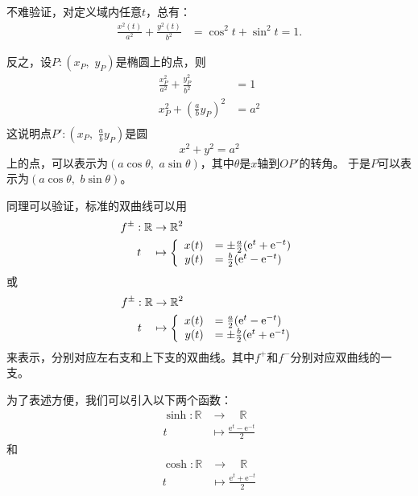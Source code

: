 \documentclass[12pt,UTF8]{ctexbook}
\begin{document}
不难验证，对定义域内任意$t$，总有：
\begin{align*}
    \frac{x^2(t)}{a^2} + \frac{y^2(t)}{b^2} &= \cos^2{t} + \sin^2{t} = 1.
\end{align*}

反之，设$P:(x_P,\,\,y_P)$是椭圆上的点，则
\begin{align*}
    \frac{x_P^2}{a^2} + \frac{y_P^2}{b^2} &= 1\\
   x_P^2 + \left(\frac{a}{b}y_P\right)^2 & = a^2 \\
\end{align*}
这说明点$\displaystyle P': \left(x_P,\,\,\frac{a}{b}y_P\right)$是圆
$$ x^2 + y^2 = a^2$$
上的点，可以表示为$(a\cos{\theta},\,\,a\sin{\theta})$，其中$\theta$是$x$轴到$OP'$的转角。
于是$P$可以表示为$(a\cos{\theta},\,\,b\sin{\theta})$。

同理可以验证，标准的双曲线可以用
\begin{align*}
    f^{\pm}: \mathbb{R} &\rightarrow \mathbb{R}^2 \\
    t\quad &\mapsto\left\{
        \begin{array}[]{rl}
            x(t) &= \pm\frac{a}{2}(\mathrm{e}^t + \mathrm{e}^{-t}) \\
            y(t) &= \frac{b}{2}(\mathrm{e}^t - \mathrm{e}^{-t}) \\
        \end{array}
    \right.
\end{align*}
或
\begin{align*}
    f^{\pm}: \mathbb{R} &\rightarrow \mathbb{R}^2 \\
    t\quad &\mapsto\left\{
        \begin{array}[]{rl}
            x(t) &= \frac{a}{2}(\mathrm{e}^t - \mathrm{e}^{-t}) \\
            y(t) &= \pm\frac{b}{2}(\mathrm{e}^t + \mathrm{e}^{-t}) \\
        \end{array}
    \right.
\end{align*}
来表示，分别对应左右支和上下支的双曲线。其中$f^+$和$f^-$分别对应双曲线的一支。

为了表述方便，我们可以引入以下两个函数：
\begin{align*}
    \sinh: \mathbb{R} &\rightarrow \quad \mathbb{R} \\
    t\; &\mapsto \frac{\mathrm{e}^t - \mathrm{e}^{-t}}{2} 
\end{align*}
和
\begin{align*}
    \cosh: \mathbb{R} &\rightarrow \quad \mathbb{R} \\
    t\; &\mapsto \frac{\mathrm{e}^t + \mathrm{e}^{-t}}{2} 
\end{align*}
\end{document}
